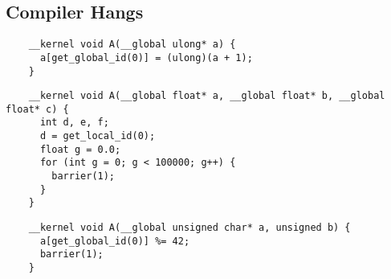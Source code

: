 \subsection{Compiler Hangs}

\newsavebox{\IntelPtrCompilerHang}
\begin{lrbox}{\IntelPtrCompilerHang}
  \hspace{1.5em}
  \begin{lstlisting}
    __kernel void A(__global ulong* a) {
      a[get_global_id(0)] = (ulong)(a + 1);
    }
  \end{lstlisting}
\end{lrbox}


\newsavebox{\IntelOptCompilerHang}
\begin{lrbox}{\IntelOptCompilerHang}
  \hspace{1.5em}
  \begin{lstlisting}
    __kernel void A(__global float* a, __global float* b, __global float* c) {
      int d, e, f;
      d = get_local_id(0);
      float g = 0.0;
      for (int g = 0; g < 100000; g++) {
        barrier(1);
      }
    }
  \end{lstlisting}
\end{lrbox}

\newsavebox{\XeonPhiSpin}
\begin{lrbox}{\XeonPhiSpin}
  \hspace{1.5em}
  \begin{lstlisting}
    __kernel void A(__global unsigned char* a, unsigned b) {
      a[get_global_id(0)] %= 42;
      barrier(1);
    }
  \end{lstlisting}
\end{lrbox}

